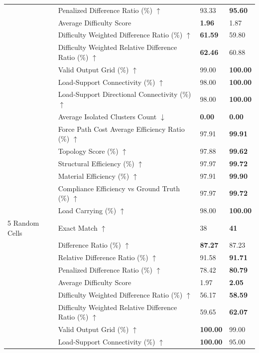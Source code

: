 \begin{table}[!h]
{\begin{tabular}{llll}
 & Penalized Difference Ratio (\%) $\uparrow$ & 93.33 & \textbf{95.60} \\
 & Average Difficulty Score & \textbf{1.96} & 1.87 \\
 & Difficulty Weighted Difference Ratio (\%) $\uparrow$ & \textbf{61.59} & 59.80 \\
 & Difficulty Weighted Relative Difference Ratio (\%) $\uparrow$ & \textbf{62.46} & 60.88 \\
 & Valid Output Grid (\%) $\uparrow$ & 99.00 & \textbf{100.00} \\
 & Load-Support Connectivity (\%) $\uparrow$ & 98.00 & \textbf{100.00} \\
 & Load-Support Directional Connectivity (\%) $\uparrow$ & 98.00 & \textbf{100.00} \\
 & Average Isolated Clusters Count $\downarrow$ & \textbf{0.00} & \textbf{0.00} \\
 & Force Path Cost Average Efficiency Ratio (\%) $\uparrow$ & 97.91 & \textbf{99.91} \\
 & Topology Score (\%) $\uparrow$ & 97.88 & \textbf{99.62} \\
 & Structural Efficiency (\%) $\uparrow$ & 97.97 & \textbf{99.72} \\
 & Material Efficiency (\%) $\uparrow$ & 97.91 & \textbf{99.90} \\
 & Compliance Efficiency vs Ground Truth (\%) $\uparrow$ & 97.97 & \textbf{99.72} \\
 & Load Carrying (\%) $\uparrow$ & 98.00 & \textbf{100.00} \\
5 Random Cells & Exact Match $\uparrow$ & 38 & \textbf{41} \\
 & Difference Ratio (\%) $\uparrow$ & \textbf{87.27} & 87.23 \\
 & Relative Difference Ratio (\%) $\uparrow$ & 91.58 & \textbf{91.71} \\
 & Penalized Difference Ratio (\%) $\uparrow$ & 78.42 & \textbf{80.79} \\
 & Average Difficulty Score & 1.97 & \textbf{2.05} \\
 & Difficulty Weighted Difference Ratio (\%) $\uparrow$ & 56.17 & \textbf{58.59} \\
 & Difficulty Weighted Relative Difference Ratio (\%) $\uparrow$ & 59.65 & \textbf{62.07} \\
 & Valid Output Grid (\%) $\uparrow$ & \textbf{100.00} & 99.00 \\
 & Load-Support Connectivity (\%) $\uparrow$ & \textbf{100.00} & 95.00 \\

\end{tabular}}
\end{table}
